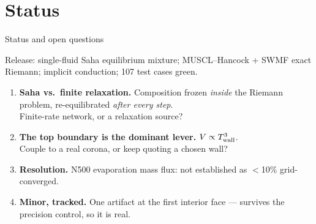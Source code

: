 \documentclass[aspectratio=169]{beamer}
\begin{document}
\section{Status}
\begin{frame}{Status and open questions}
  \begin{center}\footnotesize
    \color{gray}Release: single-fluid Saha equilibrium mixture; MUSCL--Hancock +
    SWMF exact Riemann; implicit conduction; 107 test cases green.
  \end{center}
  \vfill
  \begin{enumerate}\itemsep11pt
    \item \textbf{Saha vs.\ finite relaxation.} Composition frozen \emph{inside}
          the Riemann problem, re-equilibrated \emph{after every step}.\\
          Finite-rate network, or a relaxation source?
    \item \textbf{The top boundary is the dominant lever.} $V\propto
          T_{\rm wall}^{3}$.\\
          Couple to a real corona, or keep quoting a chosen wall?
    \item \textbf{Resolution.} N500 evaporation mass flux: not established as
          $<$10\% grid-converged.
    \item \textbf{Minor, tracked.} One artifact at the first interior face ---
          survives the precision control, so it is real.
  \end{enumerate}
  \vfill
\end{frame}

\appendix
\end{document}
